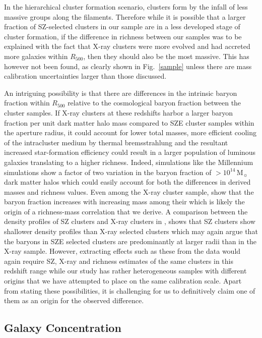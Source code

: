 \documentclass[apj,twocolumn]{emulateapj}
\begin{document}
{In the hierarchical cluster formation scenario, clusters form by the infall of less massive groups along the filaments. 
Therefore while it is possible that a larger fraction of SZ-selected clusters in our sample are in a less developed stage of cluster formation, if the difference in richness between our samples was to be explained with the fact that X-ray clusters were more evolved and had accreted more galaxies within $R_{500}$, then they should also be the most massive. This has however not been found, as clearly shown in Fig.~\ref{sample} unless there are mass calibration uncertainties larger than those discussed.

An intriguing possibility is that there are differences in the intrinsic baryon fraction within $R_{500}$ relative to the cosmological baryon fraction between the cluster samples. 
If X-ray clusters at these redshifts harbor a larger baryon fraction per unit dark matter halo mass compared to SZE cluster samples within the aperture radius,
it could account for lower total masses, more efficient cooling of the intracluster medium by thermal bremsstrahlung and the resultant increased star-formation efficiency could result in a larger population of luminous galaxies translating to a higher richness. Indeed, simulations like the Millennium simulations show a factor of two variation in the baryon fraction of $>10^{14}$\,M$_{\sun}$ dark matter halos which could easily account for both the differences in derived masses and richness values. Even among the X-ray cluster sample, \citet{Vikhlinin09} show that the baryon fraction increases with increasing mass among their which is likely the origin of
a richness-mass correlation that we derive. A comparison between the density profiles of SZ clusters and X-ray clusters in \citet{PlanckIX11}, shows that SZ clusters show shallower density profiles
than X-ray selected clusters which may again argue that the baryons in SZE selected clusters are predominantly at larger radii than in the X-ray sample.
However, extracting effects such as these from the data would again require SZ, X-ray and richness estimates of the same clusters in this redshift range
while our study has rather heterogeneous samples with different origins that we have attempted to place on the same calibration scale. Apart from stating these possibilities, it is challenging for us
to definitively claim one of them as an origin for the observed difference.

\subsection{Galaxy Concentration}

}
\end{document}
